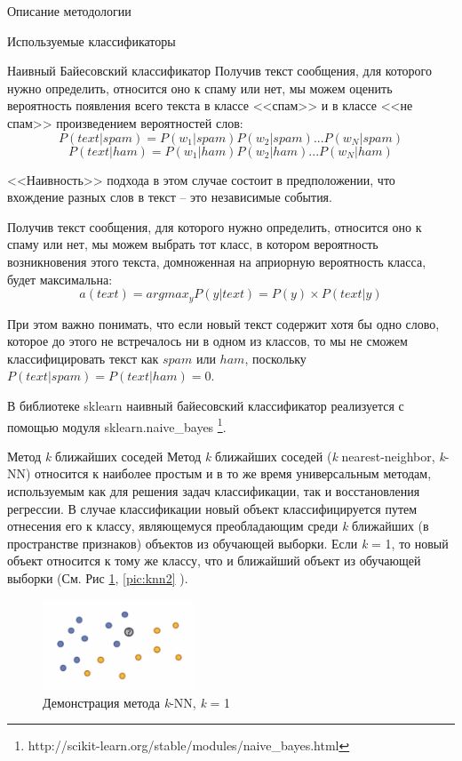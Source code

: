 \begin{section}{Описание методологии}
\begin{subsection}{Используемые классификаторы}
\begin{subsubsection}{Наивный Байесовский классификатор}
Получив текст сообщения, для которого нужно определить, относится оно к спаму или нет, мы можем оценить вероятность появления всего текста в классе <<спам>> и в классе <<не спам>> произведением вероятностей слов:
\begin{equation}
P(text|spam) = P(w_1|spam)P(w_2|spam)...P(w_N|spam)
\end{equation}
\begin{equation}
P(text|ham) = P(w_1|ham)P(w_2|ham)...P(w_N|ham)
\end{equation}

<<Наивность>> подхода в этом случае состоит в предположении, что вхождение разных слов в текст – это независимые события.

Получив текст сообщения, для которого нужно определить, относится оно к спаму или нет, мы можем выбрать тот класс, в котором вероятность возникновения этого текста, домноженная на априорную вероятность класса, будет максимальна:
\begin{equation}
a(text) = arg⁡max_{y}⁡ P(y|text) = P(y) \times P(text|y)
\end{equation}

При этом важно понимать, что если новый текст содержит хотя бы одно слово, которое до этого не встречалось ни в одном из классов, то мы не сможем классифицировать текст как $spam$ или $ham$, поскольку $P(text|spam) = P(text|ham) = 0$.


В библиотеке sklearn наивный байесовский классификатор реализуется с помощью модуля sklearn.naive\_bayes \footnote{http://scikit-learn.org/stable/modules/naive\_bayes.html}.


\end{subsubsection}

    \begin{subsubsection}{Метод \textit{k} ближайших соседей}
      \label{alg:knn}
      Метод \textit{k} ближайших соседей (\textit{k} nearest-neighbor, \textit{k}-NN) относится к наиболее простым и в то же время универсальным методам, используемым как для решения задач классификации, так и восстановления регрессии. В случае классификации новый объект классифицируется путем отнесения его к классу, являющемуся преобладающим среди \textit{k} ближайших (в пространстве признаков) объектов из обучающей выборки. Если \textit{k} = 1, то новый объект относится к тому же классу, что и ближайший объект из обучающей выборки (См. Рис \ref{pic:knn1}, \ref{pic:knn2} ).

\begin{figure}[ht!]
\centering
\includegraphics[width=0.4\textwidth]{pics/knn1}
\caption{Демонстрация метода \textit{k}-NN, \textit{k} = 1}
\label{pic:knn1}
\end{figure}



\end{subsubsection}
\end{subsection}
\end{section}
